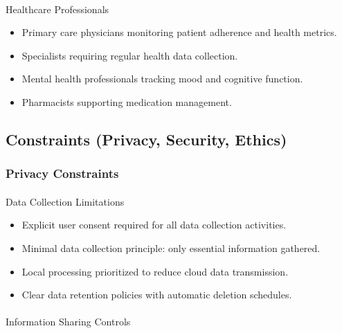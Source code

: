 \documentclass[
  letterpaper,
  DIV=11,
  numbers=noendperiod]{scrartcl}
\makeatletter
\let\oldparagraph\paragraph
\renewcommand{\paragraph}{
    \@ifstar
      \xxxParagraphStar
      \xxxParagraphNoStar
  }
\newcommand{\xxxParagraphStar}[1]{\oldparagraph*{#1}\mbox{}}
\newcommand{\xxxParagraphNoStar}[1]{\oldparagraph{#1}\mbox{}}
\providecommand{\tightlist}{%
  \setlength{\itemsep}{0pt}\setlength{\parskip}{0pt}}\usepackage{longtable,booktabs,array}
\makeatother
\begin{document}
\paragraph{Healthcare Professionals}\label{healthcare-professionals}

\begin{itemize}
\tightlist
\item
  Primary care physicians monitoring patient adherence and health
  metrics.
\item
  Specialists requiring regular health data collection.
\item
  Mental health professionals tracking mood and cognitive function.
\item
  Pharmacists supporting medication management.
\end{itemize}

\subsection{Constraints (Privacy, Security,
Ethics)}\label{constraints-privacy-security-ethics}

\subsubsection{Privacy Constraints}\label{privacy-constraints}

\paragraph{Data Collection
Limitations}\label{data-collection-limitations}

\begin{itemize}
\tightlist
\item
  Explicit user consent required for all data collection activities.
\item
  Minimal data collection principle: only essential information
  gathered.
\item
  Local processing prioritized to reduce cloud data transmission.
\item
  Clear data retention policies with automatic deletion schedules.
\end{itemize}

\paragraph{Information Sharing
Controls}\label{information-sharing-controls}
\end{document}
